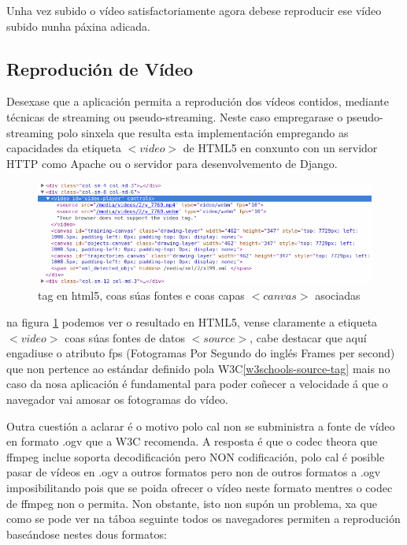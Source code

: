         
        
        Unha vez subido o vídeo satisfactoriamente agora debese reproducir ese vídeo subido nunha 
        páxina adicada.
            
    \subsection{Reprodución de Vídeo}
        Desexase que a aplicación permita a reprodución dos vídeos contidos, mediante técnicas de
        streaming ou pseudo-streaming. Neste caso empregarase o pseudo-streaming polo sinxela que
        resulta esta implementación empregando as capacidades da etiqueta $<video>$ de HTML5 en conxunto
        con un servidor HTTP como Apache ou o servidor para desenvolvemento de Django.

        \begin{figure}[htp]
        \begin{center}
            \includegraphics[scale=0.55]{figures/VideoTagHtml5.png}
            \caption{tag en html5, coas súas fontes e coas capas $<canvas>$ asociadas}
        \label{fig:VideoTagHtml5}
        \end{center}
        \end{figure}
        
        na figura \ref{fig:VideoTagHtml5} podemos ver o resultado en HTML5, vense claramente a etiqueta
        $<video>$ coas súas fontes de datos $<source>$, cabe destacar que aquí engadiuse o atributo fps
        (Fotogramas Por Segundo do inglés Frames per second) que non pertence ao estándar definido pola 
        W3C\ref{w3schools-source-tag} mais no caso da nosa aplicación é fundamental para poder coñecer 
        a velocidade á que o navegador vai amosar os fotogramas do vídeo.
        
        Outra cuestión a aclarar é o motivo polo cal non se subministra a fonte de vídeo en formato
        .ogv que a W3C recomenda. A resposta é que o codec theora que ffmpeg inclue soporta 
        decodificación pero NON codificación, polo cal é posible pasar de vídeos en .ogv a outros 
        formatos pero non de outros formatos a .ogv imposibilitando pois que se poida ofrecer o 
        vídeo neste formato mentres o codec de ffmpeg non o permita. Non obstante, isto non supón un 
        problema, xa que como se pode ver na táboa seguinte todos os navegadores permiten a reprodución
        baseándose nestes dous formatos:
        
